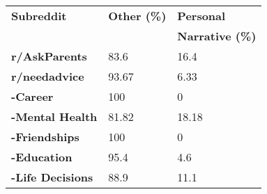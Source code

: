 \begin{tabular}{lll}
	\toprule
    \textbf{Subreddit} & \textbf{Other (\%)} & \textbf{Personal}\\
     &  & \textbf{Narrative (\%)}\\
    \midrule
    \textbf{r/AskParents} & 83.6 & 16.4\\
    \midrule
    \textbf{r/needadvice} & 93.67 & 6.33 \\
    \textbf{\quad-Career} & 100 & 0\\
    \textbf{\quad-Mental Health} & 81.82 & 18.18\\
    \textbf{\quad-Friendships} & 100 & 0\\
    \textbf{\quad-Education} & 95.4 & 4.6\\
    \textbf{\quad-Life Decisions} & 88.9 & 11.1\\
    \bottomrule
\end{tabular}
